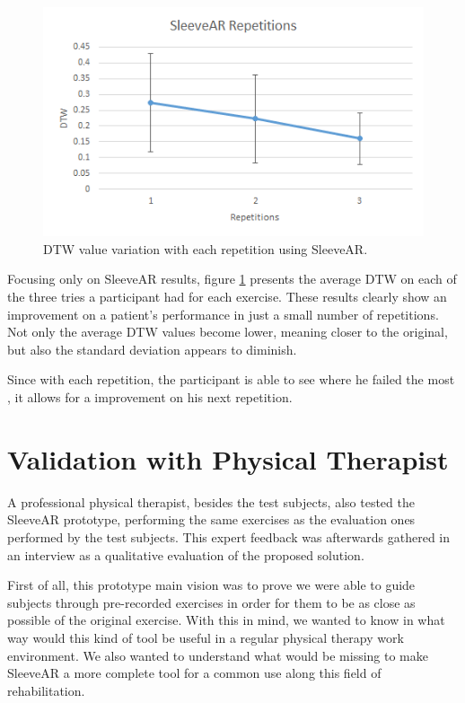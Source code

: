 \begin{figure}[t!]
    \centering
    \includegraphics{imgs/results/dtw_repetitions.png}
    \caption{DTW value variation with each repetition using SleeveAR.}
    \label{fig:dtw_repetitions}
\end{figure}

Focusing only on SleeveAR results, figure \ref{fig:dtw_repetitions} presents the average DTW on each of the three tries a participant had for each exercise. 
These results clearly show an improvement on a patient's performance in just a small number of repetitions. 
Not only the average DTW values become lower, meaning closer to the original, but also the standard deviation appears to diminish. 

Since with each repetition, the participant is able to see where he failed the most , 
it allows for a improvement on his next repetition.


\section{Validation with Physical Therapist}

A professional physical therapist, besides the test subjects, also tested the SleeveAR prototype, performing the same exercises as the evaluation ones performed by the test subjects. This expert feedback was afterwards gathered in an interview as a qualitative evaluation of the proposed solution.

First of all, this prototype main vision was to prove we were able to guide subjects through pre-recorded exercises in order for them to be as close as possible of the original exercise. With this in mind, we wanted to know in what way would this kind of tool be useful in a regular physical therapy work environment. We also wanted to understand what would be missing to make SleeveAR a more complete tool for a common use along this field of rehabilitation.


